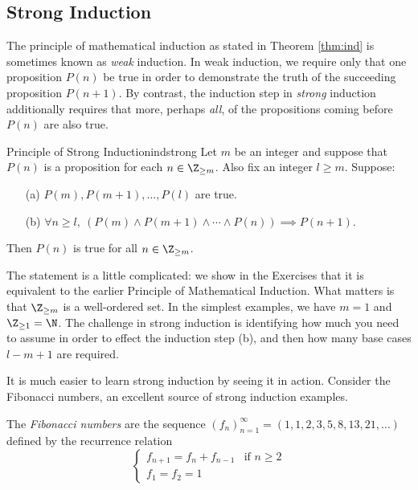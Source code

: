 \clearpage


\subsection{Strong Induction}\label{sec:strongind}

The principle of mathematical induction as stated in Theorem \ref{thm:ind} is sometimes known as \emph{weak} induction. In weak induction, we require only that one proposition $P(n)$ be true in order to demonstrate the truth of the succeeding proposition $P(n+1)$. By contrast, the induction step in \emph{strong} induction additionally requires that more, perhaps \emph{all}, of the propositions coming before $P(n)$ are also true.

\begin{thm}{Principle of Strong Induction}{indstrong}
	Let $m$ be an integer and suppose that $P(n)$ is a proposition for each $n\in\Z_{\ge m}$. Also fix an integer $l\ge m$. Suppose:
	\begin{enumerate}
	  \item[(a)] $P(m),P(m+1),\ldots,P(l)$ are true.
	  \item[(b)] $\forall n\ge l,\ (P(m)\wedge P(m+1)\wedge\cdots\wedge P(n))\implies P(n+1)$.
	\end{enumerate}
	Then $P(n)$ is true for all $n\in\Z_{\ge m}$.
\end{thm}

The statement is a little complicated: we show in the Exercises that it is equivalent to the earlier Principle of Mathematical Induction. What matters is that $\Z_{\ge m}$ is a well-ordered set. In the simplest examples, we have $m=1$ and $\Z_{\ge 1}=\N$. The challenge in strong induction is identifying how much you need to assume in order to effect the induction step (b), and then how many base cases $l-m+1$ are required.\par
It is much easier to learn strong induction by seeing it in action. Consider the Fibonacci numbers, an excellent source of strong induction examples.

\begin{defn}{}{}
	The \emph{Fibonacci numbers} are the sequence $(f_n)_{n=1}^\infty=(1,1,2,3,5,8,13,21,\ldots)$ defined by the recurrence relation
	\[
		\begin{cases}
			f_{n+1}=f_n+f_{n-1}&\text{if }n\ge 2\\
			f_1=f_2=1&
		\end{cases}
	\]
\end{defn}


